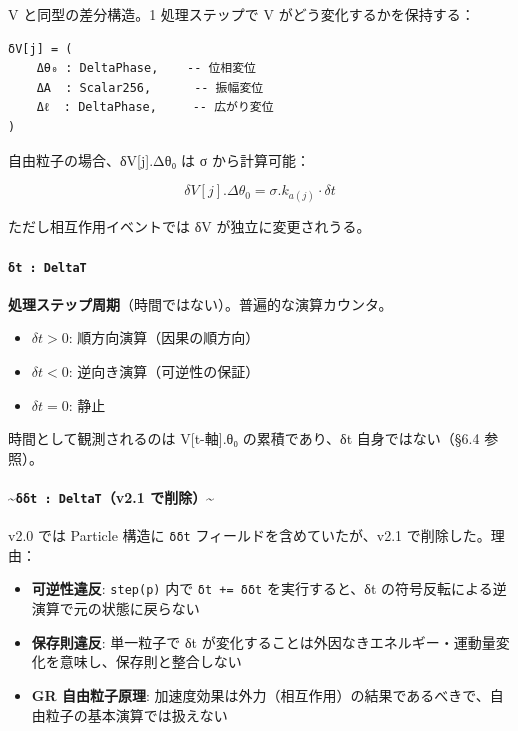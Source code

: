 \documentclass[a4paper,11pt]{ltjsarticle}
\providecommand{\tightlist}{\setlength{\itemsep}{0pt}\setlength{\parskip}{0pt}}
\begin{document}
V と同型の差分構造。1 処理ステップで V がどう変化するかを保持する：

\begin{verbatim}
δV[j] = (
    Δθ₀ : DeltaPhase,    -- 位相変位
    ΔA  : Scalar256,      -- 振幅変位
    Δℓ  : DeltaPhase,     -- 広がり変位
)
\end{verbatim}

自由粒子の場合、δV{[}j{]}.Δθ₀ は σ から計算可能：

\[\delta V[j].\Delta\theta_0 = \sigma.k_{a(j)} \cdot \delta t\]

ただし相互作用イベントでは δV が独立に変更されうる。

\paragraph{\texorpdfstring{\texttt{δt\ :\ DeltaT}}{δt : DeltaT}}\label{ux3b4t-deltat}

\textbf{処理ステップ周期}（時間ではない）。普遍的な演算カウンタ。

\begin{itemize}
\tightlist
\item
  \(\delta t > 0\): 順方向演算（因果の順方向）
\item
  \(\delta t < 0\): 逆向き演算（可逆性の保証）
\item
  \(\delta t = 0\): 静止
\end{itemize}

時間として観測されるのは V{[}t-軸{]}.θ₀ の累積であり、δt
自身ではない（§6.4 参照）。

\paragraph{\texorpdfstring{\textasciitilde{}\texttt{δδt\ :\ DeltaT}（v2.1
で削除）\textasciitilde{}}{\textasciitilde δδt : DeltaT（v2.1 で削除）\textasciitilde{}}}\label{ux3b4ux3b4t-deltatv2.1-ux3067ux524aux9664}

v2.0 では Particle 構造に \texttt{δδt} フィールドを含めていたが、v2.1
で削除した。理由：

\begin{itemize}
\tightlist
\item
  \textbf{可逆性違反}: \texttt{step(p)} 内で \texttt{δt\ +=\ δδt}
  を実行すると、δt の符号反転による逆演算で元の状態に戻らない
\item
  \textbf{保存則違反}: 単一粒子で δt
  が変化することは外因なきエネルギー・運動量変化を意味し、保存則と整合しない
\item
  \textbf{GR 自由粒子原理}:
  加速度効果は外力（相互作用）の結果であるべきで、自由粒子の基本演算では扱えない
\end{itemize}
\end{document}
